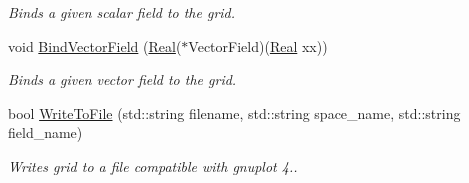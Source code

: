 \begin{DoxyCompactItemize}
\begin{DoxyCompactList}\small\item\em Binds a given scalar field to the grid. \end{DoxyCompactList}\item 
void \hyperlink{classmtk_1_1UniStgGrid1D_a5703f1f875f52f6de8f7db5a6250fafa}{Bind\+Vector\+Field} (\hyperlink{group__c01-roots_gac080bbbf5cbb5502c9f00405f894857d}{Real}($\ast$Vector\+Field)(\hyperlink{group__c01-roots_gac080bbbf5cbb5502c9f00405f894857d}{Real} xx))
\begin{DoxyCompactList}\small\item\em Binds a given vector field to the grid. \end{DoxyCompactList}\item 
bool \hyperlink{classmtk_1_1UniStgGrid1D_aec52d35ba7edc062ae4e8848ef1336ff}{Write\+To\+File} (std\+::string filename, std\+::string space\+\_\+name, std\+::string field\+\_\+name)
\begin{DoxyCompactList}\small\item\em Writes grid to a file compatible with gnuplot 4.. \end{DoxyCompactList}\end{DoxyCompactItemize}

